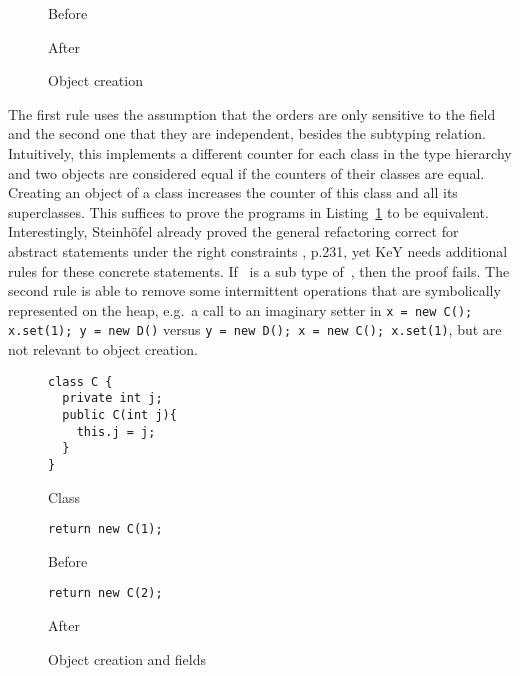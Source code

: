 \begin{figure}[tbp]
  \captionsetup{type=lstlisting}
  \centering
  \begin{sublstlisting}{.2\linewidth}
    
    \caption{Before}
  \end{sublstlisting}\hspace{1cm}
  \begin{sublstlisting}{.2\linewidth}
    
    \caption{After}
  \end{sublstlisting}
  \caption{Object creation}
  \label{lst:ObjectCreation-refinity}
\end{figure}

The first rule uses the assumption that the orders are only sensitive to the  field and the second one that they are independent, besides the subtyping relation.
Intuitively, this implements a different counter for each class in the type hierarchy and two objects are considered equal if the counters of their classes are equal.
Creating an object of a class increases the counter of this class and all its superclasses.
This suffices to prove the programs in Listing~\ref{lst:ObjectCreation-refinity} to be equivalent.
Interestingly, Steinhöfel already proved the general  refactoring correct for abstract statements under the right constraints \cite{steinhoefel-20}, p.231, yet KeY needs additional rules for these concrete statements.
If~ is a sub type of~, then the proof fails.
The second rule is able to remove some intermittent operations that are symbolically represented on the heap, e.g.\ a call to an imaginary setter in \lstinline{x = new C(); x.set(1); y = new D()} versus \lstinline{y = new D(); x = new C(); x.set(1)}, but are not relevant to object creation.

\begin{figure}[tbp]
\captionsetup{type=lstlisting}
\centering
\begin{sublstlisting}[b]{.3\linewidth}
\begin{lstlisting}[style=refinity]
class C {
  private int j;
  public C(int j){
    this.j = j;
  }
}
\end{lstlisting}
\caption{Class}
\end{sublstlisting}\hspace{3mm}
\begin{sublstlisting}[b]{.3\linewidth}
\begin{lstlisting}[style=refinity]
return new C(1);
\end{lstlisting}
\caption{Before}
\end{sublstlisting}\hspace{3mm}
\begin{sublstlisting}[b]{.3\linewidth}
\begin{lstlisting}[style=refinity]
return new C(2);
\end{lstlisting}
\caption{After}
\end{sublstlisting}
\caption{Object creation and fields}
\label{lst:ObjectCreation-refinity-2}
\end{figure}

